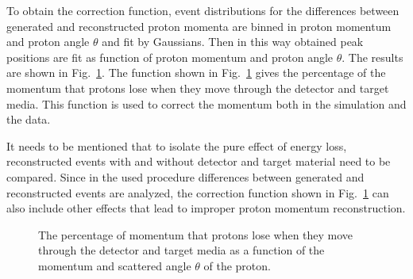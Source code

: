To obtain the correction function, event distributions for the differences between generated
and reconstructed proton momenta are binned in proton momentum and proton angle $\theta$ and fit by Gaussians. Then in this way obtained peak positions are fit as function of proton momentum and proton angle $\theta$.
The results are shown in Fig.~\ref{fig:eloss}. The function shown in Fig.~\ref{fig:eloss} gives the percentage of  the momentum that protons lose when they move through the detector and target media.
This function is used to correct the momentum both in the simulation and the data.

It needs to be mentioned that to isolate the pure effect of energy loss, reconstructed events with and without detector and target material need to be compared. Since in the used procedure differences between generated and reconstructed events are analyzed, the correction function shown in Fig.~\ref{fig:eloss} can also include other effects that lead to improper proton momentum reconstruction.

\begin{figure}[htp]
\begin{center}
\caption{\small The percentage of momentum that protons lose when they move through the detector and target media as a function of the momentum and scattered angle $\theta$ of the proton. \label{fig:eloss}} 
\end{center}
\end{figure}
